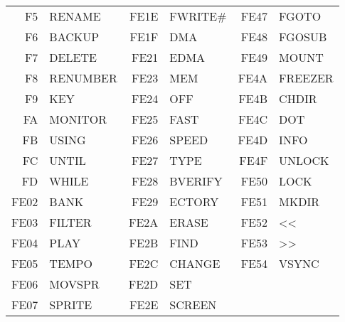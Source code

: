 {\begin{center}
\begin{tabular}{|rp{2.2cm}|rp{2.2cm}|rp{2.2cm}|}
  F5 & RENAME     & FE1E & FWRITE\#   & FE47 & FGOTO      \\
  F6 & BACKUP     & FE1F & DMA        & FE48 & FGOSUB     \\
  F7 & DELETE     & FE21 & EDMA       & FE49 & MOUNT      \\
  F8 & RENUMBER   & FE23 & MEM        & FE4A & FREEZER    \\
  F9 & KEY        & FE24 & OFF        & FE4B & CHDIR      \\
  FA & MONITOR    & FE25 & FAST       & FE4C & DOT        \\
  FB & USING      & FE26 & SPEED      & FE4D & INFO       \\
  FC & UNTIL      & FE27 & TYPE       & FE4F & UNLOCK     \\
  FD & WHILE      & FE28 & BVERIFY    & FE50 & LOCK       \\
FE02 & BANK       & FE29 & ECTORY     & FE51 & MKDIR      \\
FE03 & FILTER     & FE2A & ERASE      & FE52 & <<         \\
FE04 & PLAY       & FE2B & FIND       & FE53 & >>         \\
FE05 & TEMPO      & FE2C & CHANGE     & FE54 & VSYNC      \\
FE06 & MOVSPR     & FE2D & SET        &      &            \\
FE07 & SPRITE     & FE2E & SCREEN     &      &            \\
\hline
\end{tabular}
\end{center}
}
